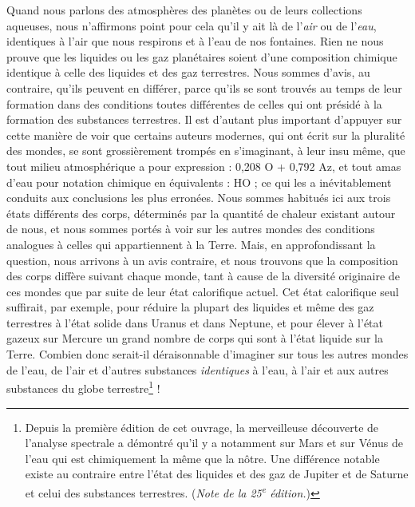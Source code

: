 \documentclass[a4paper, 11pt, oneside]{article}
\begin{document}
Quand nous parlons des atmosphères des planètes ou de leurs collections aqueuses, nous n'affirmons point pour cela qu'il y ait là de l'\emph{air} ou de l'\emph{eau}, identiques à l'air que nous respirons et à l'eau de nos fontaines. Rien ne nous prouve que les liquides ou les gaz planétaires soient d'une composition chimique identique à celle des liquides et des gaz terrestres. Nous sommes d'avis, au contraire, qu'ils peuvent en différer, parce qu'ils se sont trouvés au temps de leur formation dans des conditions toutes différentes de celles qui ont présidé à la formation des substances terrestres. Il est d'autant plus important d'appuyer sur cette manière de voir que certains auteurs modernes, qui ont écrit sur la pluralité des mondes, se sont grossièrement trompés en s'imaginant, à leur insu même, que tout milieu atmosphérique a pour expression : 0,208 O + 0,792 Az, et tout amas d'eau pour notation chimique en équivalents : HO ; ce qui les a inévitablement conduits aux conclusions les plus erronées. Nous sommes habitués ici aux trois états différents des corps, déterminés par la quantité de chaleur existant autour de nous, et nous sommes portés à voir sur les autres mondes des conditions analogues à celles qui appartiennent à la Terre. Mais, en approfondissant la question, nous arrivons à un avis contraire, et nous trouvons que la composition des corps diffère suivant chaque monde, tant à cause de la diversité originaire de ces mondes que par suite de leur état calorifique actuel. Cet état calorifique seul suffirait, par exemple, pour réduire la plupart des liquides et même des gaz terrestres à l'état solide dans Uranus et dans Neptune, et pour élever à l'état gazeux sur Mercure un grand nombre de corps qui sont à l'état liquide sur la Terre. Combien donc serait-il déraisonnable d'imaginer sur tous les autres mondes de l'eau, de l'air et d'autres substances \emph{identiques} à l'eau, à l'air et aux autres substances du globe terrestre\footnote{Depuis la première édition de cet ouvrage, la merveilleuse découverte de l'analyse spectrale a démontré qu'il y a notamment sur Mars et sur Vénus de l'eau qui est chimiquement la même que la nôtre. Une différence notable existe au contraire entre l'état des liquides et des gaz de Jupiter et de Saturne et celui des substances terrestres. (\emph{Note de la 25\textsuperscript{e} édition.})} !
\end{document}
